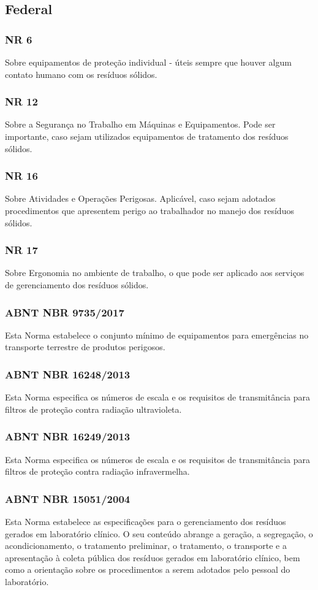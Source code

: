 \begin{subapend}
	\subsection{Federal}
	\begin{subsubapend}
		\subsubsection{NR 6}
		Sobre equipamentos de proteção individual - úteis sempre que houver algum contato humano com os resíduos sólidos.
		\subsubsection{NR 12}
		Sobre a Segurança no Trabalho em Máquinas e Equipamentos. Pode ser importante, caso sejam utilizados equipamentos de tratamento dos resíduos sólidos.
		\subsubsection{NR 16}
		Sobre Atividades e Operações Perigosas. Aplicável, caso sejam adotados procedimentos que apresentem perigo ao trabalhador no manejo dos resíduos sólidos.
		\subsubsection{NR 17}
		Sobre Ergonomia no ambiente de trabalho, o que pode ser aplicado aos serviços de gerenciamento dos resíduos sólidos.
		\subsubsection{ ABNT NBR 9735/2017}
		Esta Norma estabelece o conjunto mínimo de equipamentos para emergências no transporte terrestre de produtos perigosos.
		\subsubsection{	ABNT NBR 16248/2013}
		Esta Norma especifica os números de escala e os requisitos de transmitância para filtros de proteção contra radiação ultravioleta.
		\subsubsection{ ABNT NBR 16249/2013}
		Esta Norma especifica os números de escala e os requisitos de transmitância para filtros de proteção contra radiação infravermelha.
		\subsubsection{ABNT NBR 15051/2004}
		Esta Norma estabelece as especificações para o gerenciamento dos resíduos gerados em laboratório clínico. O seu conteúdo abrange a geração, a segregação, o acondicionamento, o tratamento preliminar, o tratamento, o transporte e a apresentação à coleta pública dos resíduos gerados em laboratório clínico, bem como a orientação sobre os procedimentos a serem adotados pelo pessoal do laboratório.
	\end{subsubapend}
\end{subapend}

